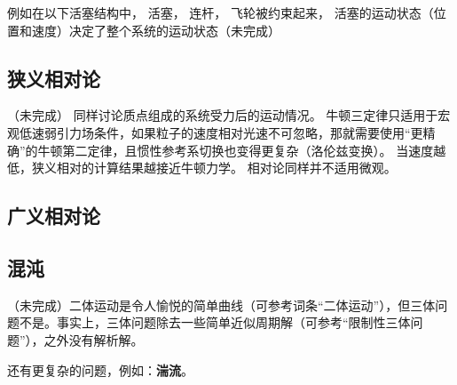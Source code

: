 例如在以下活塞结构中， 活塞， 连杆， 飞轮被约束起来， 活塞的运动状态（位置和速度）决定了整个系统的运动状态（未完成）%

\subsection{狭义相对论}
（未完成）
同样讨论质点组成的系统受力后的运动情况。 牛顿三定律只适用于宏观低速弱引力场条件，如果粒子的速度相对光速不可忽略，那就需要使用“更精确”的牛顿第二定律，且惯性参考系切换也变得更复杂（洛伦兹变换）。 当速度越低，狭义相对的计算结果越接近牛顿力学。 相对论同样并不适用微观。

\subsection{广义相对论}

\subsection{混沌}
（未完成）二体运动是令人愉悦的简单曲线（可参考词条“二体运动”），但三体问题不是。事实上，三体问题除去一些简单近似周期解（可参考“限制性三体问题”），之外没有解析解。

还有更复杂的问题，例如：\textbf{湍流}。

